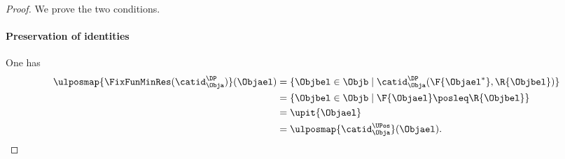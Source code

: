 \begin{proof}
    We prove the two conditions.
    \paragraph*{Preservation of identities}
    One has
    \begin{equation*}
        \begin{aligned}
            \ulposmap{\FixFunMinRes(\catid_{\Obja}^{\DP})}(\Objael) & =\{ \Objbel\in \Objb\mid \catid_{\Obja}^{\DP}(\F{\Objael^*},\R{\Objbel})\} \\
                                                                    & =\{ \Objbel \in \Objb\mid \F{\Objael}\posleq\R{\Objbel}\}                  \\
                                                                    & =\upit \{ \Objael\}                                                        \\
                                                                    & =\ulposmap{\catid_{\Obja}^{\UPos}}(\Objael).
        \end{aligned}
    \end{equation*}

\end{proof}
